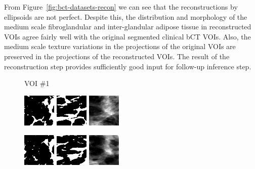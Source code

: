 \documentclass[journal]{IEEEtran}
\begin{document}
From Figure~\ref{fig:bct-datasets-recon} we can see that the
reconstructions by ellipsoids are not perfect. Despite this, the
distribution and morphology of the medium scale fibroglandular and
inter-glandular adipose tissue in reconstructed VOIs agree fairly well
with the original segmented clinical bCT VOIs. Also, the medium scale
texture variations in the projections of the original VOIs are
preserved in the projections of the reconstructed VOIs. The result of
the reconstruction step provides sufficiently good input for follow-up
inference step.

\begin{figure}[!htb]

  \centering
  \captionsetup[subfloat]{labelformat=empty}

  {\fontsize{9}{9}\selectfont VOI \#1} \vspace{1mm}

  \includegraphics[width=0.14\textwidth]
  {figure/all/dataset_3/roi_coronal}
  \includegraphics[width=0.14\textwidth]
  {figure/all/dataset_3/roi_saggital}
  \includegraphics[width=0.14\textwidth]
  {figure/all/dataset_3/proj_roi}

  \includegraphics[width=0.14\textwidth]
  {figure/all/dataset_3/model_coronal}
  \includegraphics[width=0.14\textwidth]
  {figure/all/dataset_3/model_saggital}
  \includegraphics[width=0.14\textwidth]
  {figure/all/dataset_3/proj_roi_inten10}


\end{figure}
\end{document}
